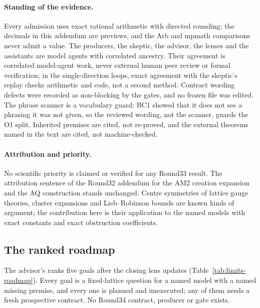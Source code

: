 \paragraph{Standing of the evidence.} Every admission uses exact rational
arithmetic with directed rounding; the decimals in this addendum are previews,
and the Arb and mpmath comparisons never admit a value. The producers, the
skeptic, the advisor, the lenses and the assistants are model agents with
correlated ancestry. Their agreement is correlated model-agent work, never
external human peer review or formal verification; in the single-direction
loops, exact agreement with the skeptic's replay checks arithmetic and code,
not a second method. Contract wording defects were recorded as non-blocking
by the gates, and no frozen file was edited. The phrase scanner is a
vocabulary guard: BC1 showed that it does not see a phrasing it was not given,
so the reviewed wording, not the scanner, guards the O1 split. Inherited
premises are cited, not re-proved, and the external theorems named in the
text \cite{ns,kp,ueltschi,yarotsky,htw} are cited, not machine-checked.

\paragraph{Attribution and priority.} No scientific priority is claimed or
verified for any Round33 result. The attribution sentence of the Round32
addendum for the AM2 creation expansion and the AQ construction
\cite{r32add,gauvin} stands unchanged. Centre symmetries of lattice gauge
theories, cluster expansions and Lieb--Robinson bounds are known kinds of
argument; the contribution here is their application to the named models
with exact constants and exact obstruction coefficients.

\subsection{The ranked roadmap}
\label{sec:limits-roadmap}
The advisor's 
ranks five goals after the closing lens updates (Table~\ref{tab:limits-roadmap}).
Every goal is a fixed-lattice question for a named model with a named missing
premise, and every one is planned and unexecuted; any of them needs a fresh
prospective contract. No Round34 contract, producer or gate exists.

